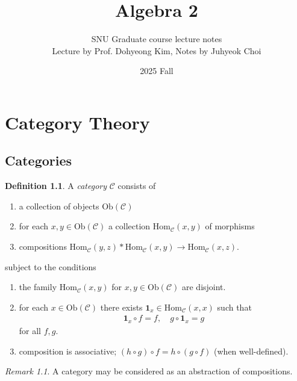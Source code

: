 \documentclass[12pt]{report}
\theoremstyle{plain}
\theoremstyle{remark}
\newtheorem*{remark}{Remark}
\theoremstyle{definition}
\newtheorem{definition}[theorem]{Definition}
\begin{document}
 
\title{Algebra 2}
\author{SNU Graduate course lecture notes \\ Lecture by Prof. Dohyeong Kim, Notes by Juhyeok Choi}
\date{2025 Fall}

 
\maketitle
\tableofcontents

\chapter{Category Theory}

\section{Categories}
\begin{definition}
    A \emph{category} $\mathcal{C}$ consists of
    \begin{enumerate}
        \item a collection of objects $\mathrm{Ob}(\mathcal{C})$
        \item for each $x,y\in \mathrm{Ob}(\mathcal{C})$ a collection $\mathrm{Hom}_\mathcal{C}(x,y)$ of morphisms
        \item compositions $\mathrm{Hom}_\mathcal{C}(y,z)*\mathrm{Hom}_\mathcal{C}(x,y)\rightarrow \mathrm{Hom}_\mathcal{C}(x,z)$.
    \end{enumerate}
    subject to the conditions
    \begin{enumerate}
        \item the family $\mathrm{Hom}_\mathcal{C}(x,y)$ for $x,y\in \mathrm{Ob}(\mathcal{C})$ are disjoint.
        \item for each $x\in \mathrm{Ob}(\mathcal{C})$ there exists $\mathbf{1}_x\in \mathrm{Hom}_\mathcal{C}(x,x)$ such that
        \begin{align*}
            \mathbf{1}_x \circ f = f,\quad g\circ \mathbf{1}_x = g
        \end{align*}
        for all $f,g$.
        \item composition is associative; $(h\circ g)\circ f = h\circ (g\circ f)$ (when well-defined).
    \end{enumerate}
\end{definition}
\begin{remark}
    A category may be considered as an abstraction of compositions.
\end{remark}
\end{document}
